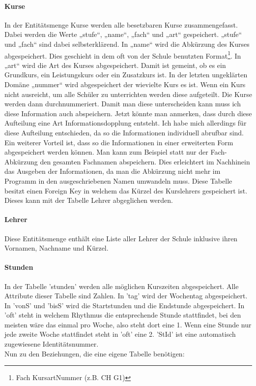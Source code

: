 \documentclass[a4paper, 12pt]{article}
\theoremstyle{plain}
\theoremstyle{definition}
\begin{document}
\paragraph{Kurse} In der Entitätsmenge Kurse werden alle besetzbaren Kurse zusammengefasst. Dabei werden die Werte „stufe“, „name“, „fach“ und „art“ gespeichert. „stufe“ und „fach“ sind dabei selbsterklärend. In „name“ wird die Abkürzung des Kurses abgespeichert. Dies geschieht in dem oft von der Schule benutzten Format\footnote{Fach KursartNummer (z.B. CH G1)}. In „art“ wird die Art des Kurses abgespeichert. Damit ist gemeint, ob es ein Grundkurs, ein Leistungskurs oder ein Zusatzkurs ist. In der letzten ungeklärten Domäne „nummer“ wird abgespeichert der wievielte Kurs es ist. Wenn ein Kurs nicht ausreicht, um alle Schüler zu unterrichten werden diese aufgeteilt. Die Kurse werden dann durchnummeriert. Damit man diese unterscheiden kann muss ich diese Information auch abspeichern. Jetzt könnte man anmerken, dass durch diese Aufteilung eine Art Informationsdopplung entsteht. Ich habe mich allerdings für diese Aufteilung entschieden, da so die Informationen individuell abrufbar sind. Ein weiterer Vorteil ist, dass so die Informationen in einer erweiterten Form abgespeichert werden können. Man kann zum Beispiel statt nur der Fach-Abkürzung den gesamten Fachnamen abspeichern. Dies erleichtert im Nachhinein das Ausgeben der Informationen, da man die Abkürzung nicht mehr im Programm in den ausgeschriebenen Namen umwandeln muss. Diese Tabelle besitzt einen Foreign Key in welchem das Kürzel des Kurslehrers gespeichert ist. Dieses kann mit der Tabelle Lehrer abgeglichen werden.

\paragraph{Lehrer}
\label{sec:Tablehrer}
Diese Entitätsmenge enthält eine Liste aller Lehrer der Schule inklusive ihren Vornamen, Nachname und Kürzel.
\paragraph{Stunden}
In der Tabelle 'stunden' werden alle möglichen Kurszeiten abgespeichert. Alle Attribute dieser Tabelle sind Zahlen. In 'tag' wird der Wochentag abgespeichert. In 'vonS' und 'bisS' wird die Startstunden und die Endstunde abgespeichert. In 'oft' steht in welchem Rhythmus die entsprechende Stunde stattfindet, bei den meisten wäre das einmal pro Woche, also steht dort eine 1. Wenn eine Stunde nur jede zweite Woche stattfindet steht in 'oft' eine 2. 'StId' ist eine automatisch zugewiesene Identitätsnummer.\\
Nun zu den Beziehungen, die eine eigene Tabelle benötigen:
\end{document}
